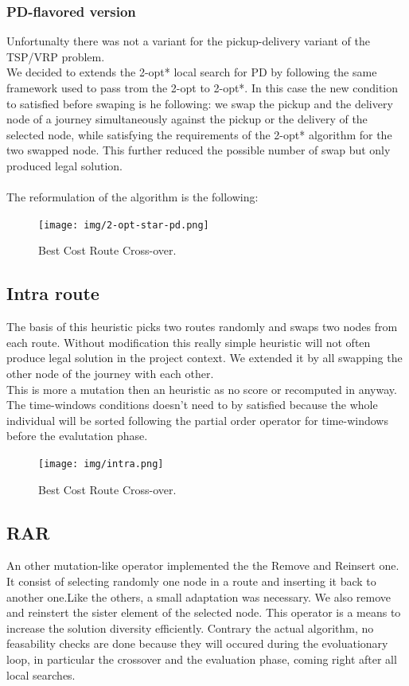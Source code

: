 \documentclass[12pt]{memoir}
\begin{document}
\subsubsection{PD-flavored version}
Unfortunalty there was not a variant for the pickup-delivery variant of the TSP/VRP problem.\\
 We decided to extends the 2-opt* local search for PD by following the same framework used to
 pass trom the 2-opt to 2-opt*. In this case the new condition to satisfied before swaping is
 he following: we swap the pickup and the delivery node of a journey simultaneously against the
 pickup or the delivery of the selected node, while satisfying the requirements of the 2-opt* 
algorithm for the two swapped node. This further reduced the possible number of swap but only 
produced legal solution.\\
\\
The reformulation of the algorithm is the following:
\\
\begin{figure}[htbp]
	\begin{center}
		\texttt{[image: img/2-opt-star-pd.png]}
		\caption{Best Cost Route Cross-over.}
	\end{center}
\end{figure}

\subsection{Intra route}
The basis of this heuristic picks two routes randomly and swaps two nodes from each route. 
Without modification this really simple heuristic will not often produce legal solution in 
the project context. We extended it by all swapping the other node of the journey with each other.\\
This is more a mutation then an heuristic as no score or recomputed in anyway. The time-windows conditions
doesn't need to by satisfied because the whole individual will be sorted following the partial order operator
for time-windows before the evalutation phase.\\
\begin{figure}[htbp]
	\begin{center}
		\texttt{[image: img/intra.png]}
		\caption{Best Cost Route Cross-over.}
	\end{center}
\end{figure}

\subsection{RAR}
An other mutation-like operator implemented the the Remove and Reinsert one. It consist of selecting randomly one node 
in a route and inserting it back to another one.Like the others, a small adaptation was necessary.
 We also remove and reinstert the sister element of the selected node. This operator is a means 
to increase the solution diversity efficiently. Contrary the actual algorithm, no feasability checks are
 done because they will occured during the evoluationary loop, in particular the crossover and 
the evaluation phase, coming right after all local searches. \\
\end{document}
